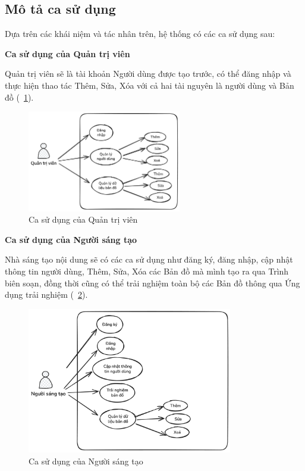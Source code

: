 \subsection*{Mô tả ca sử dụng}
Dựa trên các khái niệm và tác nhân trên, hệ thống có các ca sử dụng sau:

\textbf{Ca sử dụng của Quản trị viên}

Quản trị viên sẽ là tài khoản Người dùng được tạo trước, có thể đăng nhập và thực hiện thao
tác Thêm, Sửa, Xóa với cả hai tài nguyên là người dùng và Bản đồ (\figurename~\ref{fig:admin_use_case}).
\begin{figure}[h]
    \centering
    \includegraphics[width=0.6\textwidth]{figures/admin-use-case.excalidraw.png}
    \caption{Ca sử dụng của Quản trị viên}
    \label{fig:admin_use_case}
\end{figure}

\textbf{Ca sử dụng của Người sáng tạo}

Nhà sáng tạo nội dung sẽ có các ca sử dụng như đăng ký, đăng nhập, cập nhật
thông tin người dùng, Thêm, Sửa, Xóa các Bản đồ mà mình tạo ra qua Trình biên soạn,
đồng thời cũng có thể trải nghiệm toàn bộ các Bản đồ thông qua Ứng dụng trải nghiệm
(\figurename~\ref{fig:creator_use_case}).
\begin{figure}[h]
    \centering
    \includegraphics[width=0.8\textwidth]{figures/creator-use-case.excalidraw.png}
    \caption{Ca sử dụng của Người sáng tạo}
    \label{fig:creator_use_case}
\end{figure}

